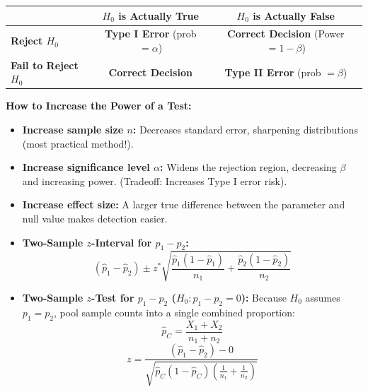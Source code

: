 \begin{lessonbox}
\begin{center}
\begin{tabular}{|l|c|c|}
\hline
& \textbf{$H_0$ is Actually True} & \textbf{$H_0$ is Actually False} \\
\hline
\textbf{Reject $H_0$} & \textbf{Type I Error} (prob $= \alpha$) & \textbf{Correct Decision} (Power $= 1 - \beta$) \\
\hline
\textbf{Fail to Reject $H_0$} & \textbf{Correct Decision} & \textbf{Type II Error} (prob $= \beta$) \\
\hline
\end{tabular}
\end{center}
\textbf{How to Increase the Power of a Test:}
\begin{itemize}[leftmargin=1.2em]
  \item \textbf{Increase sample size $n$:} Decreases standard error, sharpening distributions (most practical method!).
  \item \textbf{Increase significance level $\alpha$:} Widens the rejection region, decreasing $\beta$ and increasing power. (Tradeoff: Increases Type I error risk).
  \item \textbf{Increase effect size:} A larger true difference between the parameter and null value makes detection easier.
\end{itemize}
\end{lessonbox}

\begin{lessonbox}
\begin{itemize}[leftmargin=1.2em]
  \item \textbf{Two-Sample $z$-Interval for $p_1 - p_2$:}
  \begin{equation}
    (\hat{p}_1 - \hat{p}_2) \pm z^* \sqrt{\frac{\hat{p}_1(1-\hat{p}_1)}{n_1} + \frac{\hat{p}_2(1-\hat{p}_2)}{n_2}}
  \end{equation}
  \item \textbf{Two-Sample $z$-Test for $p_1 - p_2$ ($H_0: p_1 - p_2 = 0$):}
  Because $H_0$ assumes $p_1 = p_2$, pool sample counts into a single combined proportion:
  \begin{equation}
    \hat{p}_C = \frac{X_1 + X_2}{n_1 + n_2}
  \end{equation}
  \begin{equation}
    z = \frac{(\hat{p}_1 - \hat{p}_2) - 0}{\sqrt{\hat{p}_C(1-\hat{p}_C)\left(\frac{1}{n_1} + \frac{1}{n_2}\right)}}
  \end{equation}
\end{itemize}
\end{lessonbox}

